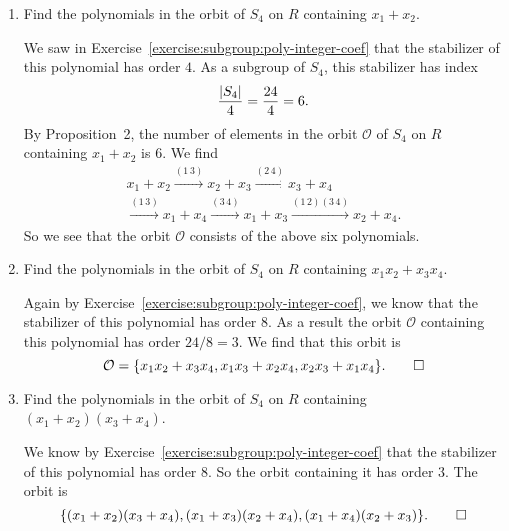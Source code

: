 \begin{enumerate}
\item Find the polynomials in the orbit of $S_4$ on $R$ containing
  $x_1 + x_2$.
  \begin{solution}
    We saw in Exercise~\ref{exercise:subgroup:poly-integer-coef} that
    the stabilizer of this polynomial has order $4$. As a subgroup of
    $S_4$, this stabilizer has index
    \begin{equation*}
      \frac{\lvert{S_4}\rvert}4 = \frac{24}4 = 6.
    \end{equation*}
    By Proposition~2, the number of elements in the orbit
    $\mathcal{O}$ of $S_4$ on $R$ containing $x_1 + x_2$ is $6$. We
    find
    \begin{multline*}
      x_1 + x_2
      \xrightarrow{(1\,3)}
      x_2 + x_3
      \xrightarrow{(2\,4)}
      x_3 + x_4 \\
      \xrightarrow{(1\,3)}
      x_1 + x_4
      \xrightarrow{(3\,4)}
      x_1 + x_3
      \xrightarrow{(1\,2)(3\,4)}
      x_2 + x_4.
    \end{multline*}
    So we see that the orbit $\mathcal{O}$ consists of the above six
    polynomials.
  \end{solution}

\item Find the polynomials in the orbit of $S_4$ on $R$ containing
  $x_1x_2 + x_3x_4$.
  \begin{solution}
    Again by Exercise~\ref{exercise:subgroup:poly-integer-coef}, we
    know that the stabilizer of this polynomial has order $8$. As a
    result the orbit $\mathcal{O}$ containing this polynomial has
    order $24/8 = 3$. We find that this orbit is
    \begin{equation*}
      \mathcal{O} =
      \{x_1x_2 + x_3x_4, x_1x_3 + x_2x_4, x_2x_3 + x_1x_4\}.
      \qedhere
    \end{equation*}
  \end{solution}

\item Find the polynomials in the orbit of $S_4$ on $R$ containing
  $(x_1 + x_2)(x_3 + x_4)$.
  \begin{solution}
    We know by Exercise~\ref{exercise:subgroup:poly-integer-coef} that
    the stabilizer of this polynomial has order $8$. So the orbit
    containing it has order $3$. The orbit is
    \begin{equation*}
      \{(x_1+x_2)(x_3+x_4), (x_1+x_3)(x_2+x_4), (x_1+x_4)(x_2+x_3)\}.
      \qedhere
    \end{equation*}
  \end{solution}
\end{enumerate}

